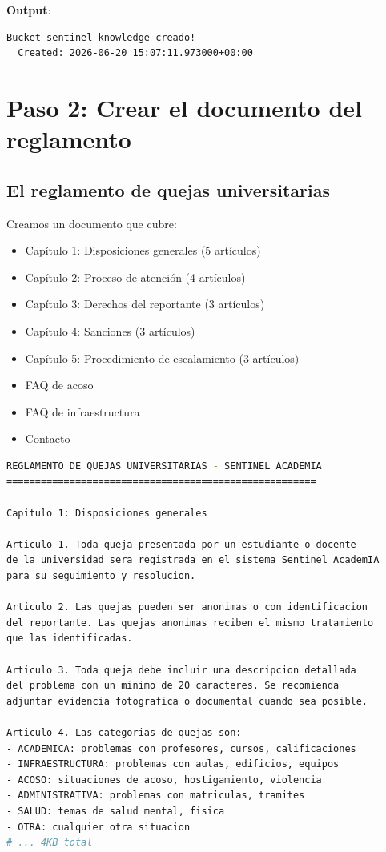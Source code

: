 \documentclass[11pt,a4paper,oneside]{article}
\begin{document}
\textbf{Output}:
\begin{lstlisting}
Bucket sentinel-knowledge creado!
  Created: 2026-06-20 15:07:11.973000+00:00
\end{lstlisting}

\section{Paso 2: Crear el documento del reglamento}

\subsection{El reglamento de quejas universitarias}

Creamos un documento que cubre:

\begin{itemize}
  \item Cap\'itulo 1: Disposiciones generales (5 art\'iculos)
  \item Cap\'itulo 2: Proceso de atenci\'on (4 art\'iculos)
  \item Cap\'itulo 3: Derechos del reportante (3 art\'iculos)
  \item Cap\'itulo 4: Sanciones (3 art\'iculos)
  \item Cap\'itulo 5: Procedimiento de escalamiento (3 art\'iculos)
  \item FAQ de acoso
  \item FAQ de infraestructura
  \item Contacto
\end{itemize}

\begin{lstlisting}[language=bash,caption={knowledge/reglamento.txt}]
REGLAMENTO DE QUEJAS UNIVERSITARIAS - SENTINEL ACADEMIA
======================================================

Capitulo 1: Disposiciones generales

Articulo 1. Toda queja presentada por un estudiante o docente
de la universidad sera registrada en el sistema Sentinel AcademIA
para su seguimiento y resolucion.

Articulo 2. Las quejas pueden ser anonimas o con identificacion
del reportante. Las quejas anonimas reciben el mismo tratamiento
que las identificadas.

Articulo 3. Toda queja debe incluir una descripcion detallada
del problema con un minimo de 20 caracteres. Se recomienda
adjuntar evidencia fotografica o documental cuando sea posible.

Articulo 4. Las categorias de quejas son:
- ACADEMICA: problemas con profesores, cursos, calificaciones
- INFRAESTRUCTURA: problemas con aulas, edificios, equipos
- ACOSO: situaciones de acoso, hostigamiento, violencia
- ADMINISTRATIVA: problemas con matriculas, tramites
- SALUD: temas de salud mental, fisica
- OTRA: cualquier otra situacion
# ... 4KB total
\end{lstlisting}
\end{document}
